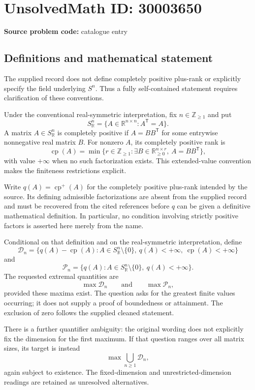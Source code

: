 \documentclass[11pt]{article}
\newcommand{\Z}{\mathbb{Z}}
\newcommand{\R}{\mathbb{R}}
\begin{document}
\section*{UnsolvedMath ID: 30003650}
\textbf{Source problem code:} catalogue entry
\subsection{Definitions and mathematical statement}
The supplied record does not define completely positive plus-rank or explicitly specify the field underlying $S^n$. Thus a fully self-contained statement requires clarification of these conventions.

Under the conventional real-symmetric interpretation, fix $n\in\Z_{\geq 1}$ and put
\[
S^n_{\R}=\{A\in\R^{n\times n}:A^{\mathsf T}=A\}.
\]
A matrix $A\in S^n_{\R}$ is completely positive if $A=BB^{\mathsf T}$ for some entrywise nonnegative real matrix $B$. For nonzero $A$, its completely positive rank is
\[
\operatorname{cp}(A)=\min\{r\in\Z_{\geq1}:\exists B\in\R_{\geq0}^{n\times r},\ A=BB^{\mathsf T}\},
\]
with value $+\infty$ when no such factorization exists. This extended-value convention makes the finiteness restrictions explicit.

Write $q(A)=\operatorname{cp}^{+}(A)$ for the completely positive plus-rank intended by the source. Its defining admissible factorizations are absent from the supplied record and must be recovered from the cited references before $q$ can be given a definitive mathematical definition. In particular, no condition involving strictly positive factors is asserted here merely from the name.

Conditional on that definition and on the real-symmetric interpretation, define
\[
\mathcal D_n=\{q(A)-\operatorname{cp}(A):A\in S^n_{\R}\setminus\{0\},\ q(A)<+\infty,\ \operatorname{cp}(A)<+\infty\}
\]
and
\[
\mathcal P_n=\{q(A):A\in S^n_{\R}\setminus\{0\},\ q(A)<+\infty\}.
\]
The requested extremal quantities are
\[
\max\mathcal D_n\qquad\text{and}\qquad\max\mathcal P_n,
\]
provided these maxima exist. The question asks for the greatest finite values occurring; it does not supply a proof of boundedness or attainment. The exclusion of zero follows the supplied cleaned statement.

There is a further quantifier ambiguity: the original wording does not explicitly fix the dimension for the first maximum. If that question ranges over all matrix sizes, its target is instead
\[
\max\bigcup_{n\geq1}\mathcal D_n,
\]
again subject to existence. The fixed-dimension and unrestricted-dimension readings are retained as unresolved alternatives.
\end{document}
